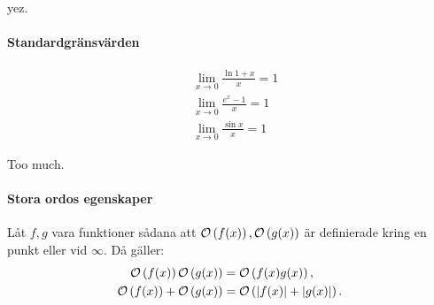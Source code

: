 \proof
yez.

\paragraph{Standardgränsvärden}
\begin{align*}
	&\lim\limits_{x\to 0}\frac{\ln{1 + x}}{x} = 1 \\
	&\lim\limits_{x\to 0}\frac{e^x - 1}{x} = 1 \\
	&\lim\limits_{x\to 0}\frac{\sin{x}}{x} = 1
\end{align*}

\proof
Too much.

\paragraph{Stora ordos egenskaper}
Låt $f, g$ vara funktioner sådana att $\mathcal{O}\left(f(x)\right), \mathcal{O}\left(g(x)\right)$ är definierade kring en punkt eller vid $\infty$. Då gäller:
\begin{align*}
	\mathcal{O}\left(f(x)\right)\mathcal{O}\left(g(x)\right)    &= \mathcal{O}\left(f(x)g(x)\right), \\
	\mathcal{O}\left(f(x)\right) + \mathcal{O}\left(g(x)\right) &= \mathcal{O}\left(\abs{f(x)} + \abs{g(x)}\right).
\end{align*}

\proof